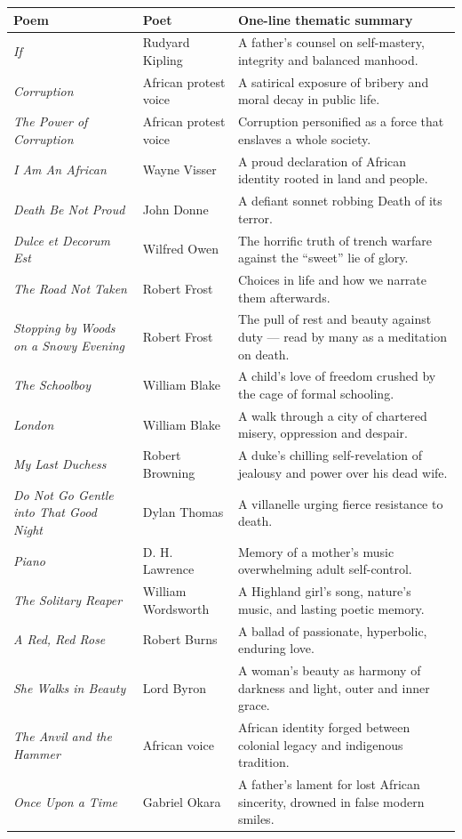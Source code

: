 \documentclass[11pt]{article}
\begin{document}
\begin{center}
\begin{tabularx}{\linewidth}{|l|l|X|}
\hline
\rowcolor{popblueL} \textbf{Poem} & \textbf{Poet} & \textbf{One-line thematic summary} \\
\hline
\emph{If} & Rudyard Kipling & A father's counsel on self-mastery, integrity and balanced manhood. \\
\hline
\emph{Corruption} & African protest voice & A satirical exposure of bribery and moral decay in public life. \\
\hline
\emph{The Power of Corruption} & African protest voice & Corruption personified as a force that enslaves a whole society. \\
\hline
\emph{I Am An African} & Wayne Visser & A proud declaration of African identity rooted in land and people. \\
\hline
\emph{Death Be Not Proud} & John Donne & A defiant sonnet robbing Death of its terror. \\
\hline
\emph{Dulce et Decorum Est} & Wilfred Owen & The horrific truth of trench warfare against the ``sweet'' lie of glory. \\
\hline
\emph{The Road Not Taken} & Robert Frost & Choices in life and how we narrate them afterwards. \\
\hline
\emph{Stopping by Woods on a Snowy Evening} & Robert Frost & The pull of rest and beauty against duty — read by many as a meditation on death. \\
\hline
\emph{The Schoolboy} & William Blake & A child's love of freedom crushed by the cage of formal schooling. \\
\hline
\emph{London} & William Blake & A walk through a city of chartered misery, oppression and despair. \\
\hline
\emph{My Last Duchess} & Robert Browning & A duke's chilling self-revelation of jealousy and power over his dead wife. \\
\hline
\emph{Do Not Go Gentle into That Good Night} & Dylan Thomas & A villanelle urging fierce resistance to death. \\
\hline
\emph{Piano} & D. H. Lawrence & Memory of a mother's music overwhelming adult self-control. \\
\hline
\emph{The Solitary Reaper} & William Wordsworth & A Highland girl's song, nature's music, and lasting poetic memory. \\
\hline
\emph{A Red, Red Rose} & Robert Burns & A ballad of passionate, hyperbolic, enduring love. \\
\hline
\emph{She Walks in Beauty} & Lord Byron & A woman's beauty as harmony of darkness and light, outer and inner grace. \\
\hline
\emph{The Anvil and the Hammer} & African voice & African identity forged between colonial legacy and indigenous tradition. \\
\hline
\emph{Once Upon a Time} & Gabriel Okara & A father's lament for lost African sincerity, drowned in false modern smiles. \\
\hline
\end{tabularx}
\end{center}
\end{document}
